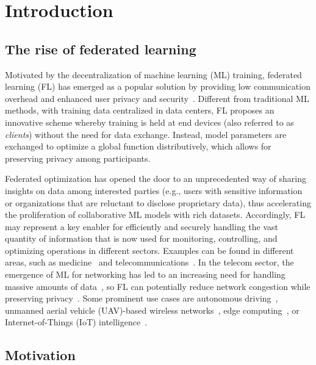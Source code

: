 \documentclass[lettersize,journal]{IEEEtran}
\begin{document}
\IEEEdisplaynontitleabstractindextext

\IEEEpeerreviewmaketitle

\section{Introduction}\label{sec:introduction}

\subsection{The rise of federated learning}

Motivated by the decentralization of machine learning (ML) training, federated learning (FL) has emerged as a popular solution by providing low communication overhead and enhanced user privacy and security~\cite{konevcny2016federated}. Different from traditional ML methods, with training data centralized in data centers, FL proposes an innovative scheme whereby training is held at end devices (also referred to as \emph{clients}) without the need for data exchange. Instead, model parameters are exchanged to optimize a global function distributively, which allows for preserving privacy among participants.

Federated optimization has opened the door to an unprecedented way of sharing insights on data among interested parties (e.g., users with sensitive information or organizations that are reluctant to disclose proprietary data), thus accelerating the proliferation of collaborative ML models with rich datasets. Accordingly, FL may represent a key enabler for efficiently and securely handling the vast quantity of information that is now used for monitoring, controlling, and optimizing operations in different sectors. Examples can be found in different areas, such as medicine~\cite{chen2020fedhealth, nguyen2021federated2} and telecommunications~\cite{lim2020federated}. In the telecom sector, the emergence of ML for networking has led to an increasing need for handling massive amounts of data~\cite{wilhelmi2020flexible}, so FL can potentially reduce network congestion while preserving privacy~\cite{niknam2020federated}. Some prominent use cases are autonomous driving~\cite{du2020federated}, unmanned aerial vehicle (UAV)-based wireless networks~\cite{brik2020federated}, edge computing~\cite{wang2019adaptive}, or Internet-of-Things (IoT) intelligence~\cite{mills2019communication}. 

\subsection{Motivation}
\end{document}

